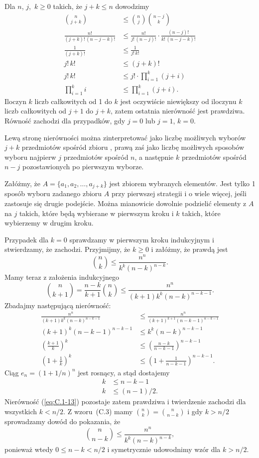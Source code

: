 \exercise{} %
Dla $n$, $j$,~$k\ge0$ takich, że $j+k\le n$ dowodzimy
\begin{align*}
	\binom{n}{j+k} &\le \binom{n}{j}\binom{n-j}{k} \\
	\frac{n!}{(j+k)!\,(n-j-k)!} &\le \frac{n!}{j!\,(n-j)!}\cdot\frac{(n-j)!}{k!\,(n-j-k)!} \\
	\frac{1}{(j+k)!} &\le \frac{1}{j!\,k!} \\
	j!\,k! &\le (j+k)! \\
	j!\,k! &\le j!\cdot\prod_{i=1}^k(j+i) \\
	\prod_{i=1}^ki &\le \prod_{i=1}^k(j+i).
\end{align*}
Iloczyn $k$ liczb całkowitych od 1 do $k$ jest oczywiście niewiększy od iloczynu $k$ liczb całkowitych od $j+1$ do $j+k$, zatem ostatnia nierówność jest prawdziwa. Równość zachodzi dla przypadków, gdy $j=0$ lub $j=1$, $k=0$.

Lewą stronę nierówności można zinterpretować jako liczbę możliwych wyborów $j+k$ przedmiotów spośród zbioru , prawą zaś jako liczbę możliwych sposobów wyboru najpierw $j$ przedmiotów spośród $n$, a następnie $k$ przedmiotów spośród $n-j$ pozostawionych po pierwszym wyborze.

Załóżmy, że $A=\{a_1,a_2,\dots,a_{j+k}\}$ jest zbiorem wybranych elementów. Jest tylko 1 sposób wyboru zadanego zbioru $A$ przy pierwszej strategii i o wiele więcej, jeśli zastosuje się drugie podejście. Można mianowicie dowolnie podzielić elementy z $A$ na $j$ takich, które będą wybierane w pierwszym kroku i $k$ takich, które wybierzemy w drugim kroku.

\exercise{} %
Przypadek dla $k=0$ sprawdzamy w pierwszym kroku indukcyjnym i stwierdzamy, że zachodzi. Przyjmijmy, że $k\ge0$ i załóżmy, że prawdą jest
\[
	\binom{n}{k} \le \frac{n^n}{k^k(n-k)^{n-k}}.
\]
Mamy teraz z założenia indukcyjnego
\[
	\binom{n}{k+1} = \frac{n-k}{k+1}\binom{n}{k} \le \frac{n^n}{(k+1)k^k(n-k)^{n-k-1}}.
\]
Zbadajmy następującą nierówność:
\begin{align}
	\frac{n^n}{(k+1)k^k(n-k)^{n-k-1}} &\le \frac{n^n}{(k+1)^{k+1}(n-k-1)^{n-k-1}} \nonumber \\[1mm]
	(k+1)^k(n-k-1)^{n-k-1} &\le k^k(n-k)^{n-k-1} \nonumber \\[1mm]
	\left(\frac{k+1}{k}\right)^k &\le \left(\frac{n-k}{n-k-1}\right)^{n-k-1} \nonumber \\
	\left(1+\frac{1}{k}\right)^k &\le \left(1+\frac{1}{n-k-1}\right)^{n-k-1}. \label{eq:C.1-13}
\end{align}
Ciąg $e_n={(1+1/n)}^n$ jest rosnący, a stąd dostajemy
\begin{align*}
	k &\le n-k-1 \\
	k &\le (n-1)/2.
\end{align*}
Nierówność (\ref{eq:C.1-13}) pozostaje zatem prawdziwa i twierdzenie zachodzi dla wszystkich $k<n/2$. Z wzoru~(C.3) mamy $\binom{n}{k}=\binom{n}{n-k}$ i gdy $k>n/2$ sprowadzamy dowód do pokazania, że
\[
	\binom{n}{n-k} \le \frac{n^n}{k^k(n-k)^{n-k}},
\]
ponieważ wtedy $0\le n-k<n/2$ i symetrycznie udowodnimy wzór dla $k>n/2$.

